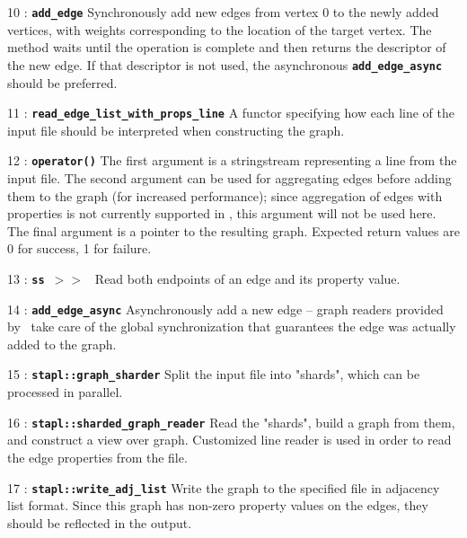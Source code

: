 \documentclass{report}
\begin{document}
\begin{hashitemize}
\item 10 : \texttt{{\bf add\_edge}}
\newline
Synchronously add new edges from vertex 0 to the newly added vertices, with
weights corresponding to the location of the target vertex. The method waits
until the operation is complete and then returns the descriptor of the new edge.
If that descriptor is not used, the asynchronous \texttt{{\bf add\_edge\_async}}
should be preferred.

\item 11 : \texttt{{\bf read\_edge\_list\_with\_props\_line}}
\newline
A functor specifying how each line of the input file should be interpreted when
constructing the graph.

\item 12 : \texttt{{\bf operator()}}
\newline
The first argument is a stringstream representing a line from the input file.
The second argument can be used for aggregating edges before adding them to the
graph (for increased performance); since aggregation of edges with properties is
not currently supported in \stapl, this argument will not be used here. The
final argument is a pointer to the resulting graph. Expected return values are 
0 for success, 1 for failure.

\item 13 : \texttt{{\bf ss $>>$ }}
\newline
Read both endpoints of an edge and its property value.

\item 14 : \texttt{{\bf add\_edge\_async}}
\newline
Asynchronously add a new edge -- graph readers provided by \stapl\ take care of
the global synchronization that guarantees the edge was actually added to the
graph.

\item 15 : \texttt{{\bf stapl::graph\_sharder}}
\newline
Split the input file into "shards", which can be processed in parallel. 

\item 16 : \texttt{{\bf stapl::sharded\_graph\_reader}}
\newline
Read the "shards", build a graph from them, and construct a view over
graph. Customized line reader is used in order to read the edge properties 
from the file.

\item 17 : \texttt{{\bf stapl::write\_adj\_list}}
\newline
Write the graph to the specified file in adjacency list format.
Since this graph has non-zero property values on the edges, they
should be reflected in the output.

\end{hashitemize}
\end{document}
